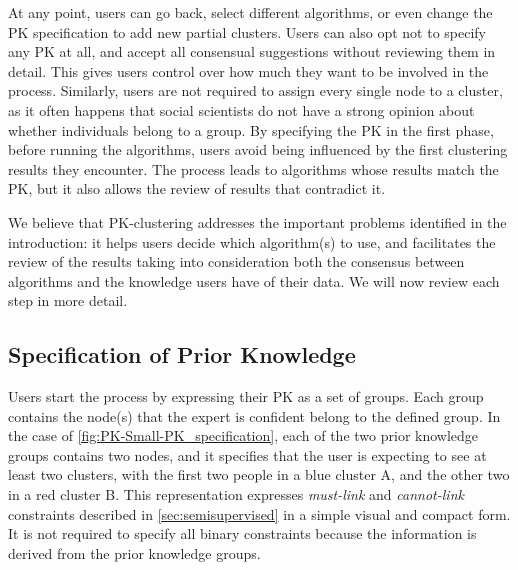 At any point, users can go back, select different algorithms, or even change the PK specification to add new partial clusters.  Users can also opt not to specify any PK at all, and accept all consensual suggestions without reviewing them in detail. This gives users control over how much they want to be involved in the process. Similarly, users are not required to assign every single node to a cluster, as it often happens that social scientists do not have a strong opinion about whether individuals belong to a group.
By specifying the PK in the first phase, before running the algorithms, users avoid being influenced by the first clustering results they encounter.  The process leads to algorithms whose results match the PK, but it also allows the review of results that contradict it.


We believe that PK-clustering addresses the important problems identified in the introduction: it helps users decide which algorithm(s) to use, and facilitates the review of the results taking into consideration both the consensus between algorithms and the knowledge users have of their data.
We will now review each step in more detail.




\subsection{Specification of Prior Knowledge}

Users start the process by expressing their PK as a set of groups. Each group contains the node(s) that the expert is confident belong to the defined group.
In the case of \autoref{fig:PK-Small-PK_specification}, each of the two prior knowledge groups contains two nodes, and it specifies that the user is expecting to see at least two clusters, with the first two people in a blue cluster A, and the other two in a red cluster B.
This representation expresses \emph{must-link} and \emph{cannot-link} constraints described in \autoref{sec:semisupervised} in a simple visual and compact form. It is not required to specify all binary constraints because the information is derived from the prior knowledge groups.

